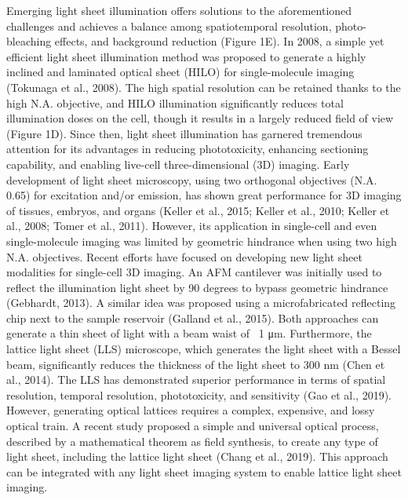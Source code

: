 Emerging light sheet illumination offers solutions to the aforementioned challenges and achieves a balance among spatiotemporal resolution, photo-bleaching effects, and background reduction (Figure 1E). In 2008, a simple yet efficient light sheet illumination method was proposed to generate a highly inclined and laminated optical sheet (HILO) for single-molecule imaging (Tokunaga et al., 2008). The high spatial resolution can be retained thanks to the high N.A. objective, and HILO illumination significantly reduces total illumination doses on the cell, though it results in a largely reduced field of view (Figure 1D). Since then, light sheet illumination has garnered tremendous attention for its advantages in reducing phototoxicity, enhancing sectioning capability, and enabling live-cell three-dimensional (3D) imaging. Early development of light sheet microscopy, using two orthogonal objectives (N.A. ~ 0.65) for excitation and/or emission, has shown great performance for 3D imaging of tissues, embryos, and organs (Keller et al., 2015; Keller et al., 2010; Keller et al., 2008; Tomer et al., 2011). However, its application in single-cell and even single-molecule imaging was limited by geometric hindrance when using two high N.A. objectives. Recent efforts have focused on developing new light sheet modalities for single-cell 3D imaging. An AFM cantilever was initially used to reflect the illumination light sheet by 90 degrees to bypass geometric hindrance (Gebhardt, 2013). A similar idea was proposed using a microfabricated reflecting chip next to the sample reservoir (Galland et al., 2015). Both approaches can generate a thin sheet of light with a beam waist of ~1 μm. Furthermore, the lattice light sheet (LLS) microscope, which generates the light sheet with a Bessel beam, significantly reduces the thickness of the light sheet to 300 nm (Chen et al., 2014). The LLS has demonstrated superior performance in terms of spatial resolution, temporal resolution, phototoxicity, and sensitivity (Gao et al., 2019). However, generating optical lattices requires a complex, expensive, and lossy optical train. A recent study proposed a simple and universal optical process, described by a mathematical theorem as field synthesis, to create any type of light sheet, including the lattice light sheet (Chang et al., 2019). This approach can be integrated with any light sheet imaging system to enable lattice light sheet imaging.

